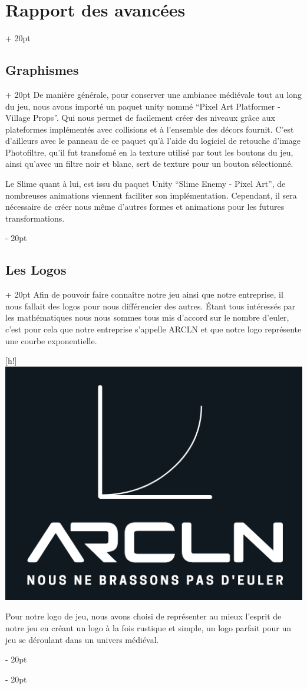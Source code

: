 \documentclass[a4paper, 12pt, twoside]{article}
\newcommand{\ind}[1][20pt]{\advance\leftskip + #1}
\newcommand{\deind}[1][20pt]{\advance\leftskip - #1}
\newenvironment{indt}[2][20pt]{#2 \par \ind[#1]}{\par \deind} %
\begin{document}
\begin{indt}{\section{Rapport des avancées}}
\begin{indt}{\subsection{Graphismes}}
            De manière générale, pour conserver une ambiance médiévale tout au long du jeu, nous avons importé un paquet unity nommé “Pixel Art Platformer - Village Props”. Qui nous permet de facilement créer des niveaux grâce aux plateformes implémentés avec collisions et à l'ensemble des décors fournit. C'est d'ailleurs avec le panneau de ce paquet qu'à l'aide du logiciel de retouche d'image Photofiltre, qu'il fut transfomé en la texture utilisé par tout les boutons du jeu, ainsi qu'avec un filtre noir et blanc, sert de texture pour un bouton sélectionné. 

            Le Slime quant à lui, est issu du paquet Unity “Slime Enemy - Pixel Art”, de nombreuses animations viennent faciliter son implémentation. Cependant, il sera nécessaire de créer nous même d'autres formes et animations pour les futures transformations.
        \end{indt}

        \begin{indt}{\subsection{Les Logos}}
            Afin de pouvoir faire connaître notre jeu ainsi que notre entreprise, il nous fallait des logos pour nous différencier des autres. Étant tous intéressés par les mathématiques nous nous sommes tous mis d'accord sur le nombre d'euler, c'est pour cela que notre entreprise s'appelle ARCLN et que notre logo représente une courbe exponentielle.
        
            \begin{center}[h!]
                \includegraphics[width=0.5\linewidth]{Logo2.png}
            \end{center}

            Pour notre logo de jeu, nous avons choisi de représenter au mieux l'esprit de notre jeu en créant un logo à la fois rustique et simple, un logo parfait pour un jeu se déroulant dans un univers médiéval.
        \end{indt}


\end{indt}
\end{document}
